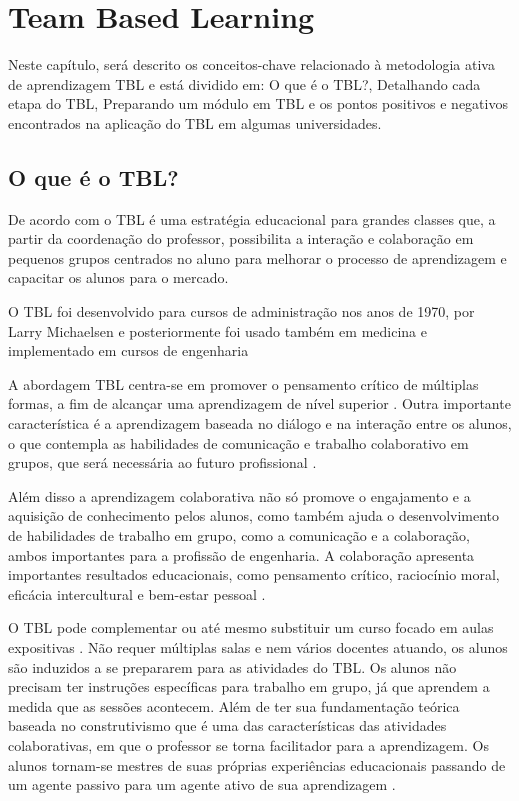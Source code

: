 \chapter{Team Based Learning}

Neste capítulo, será descrito os conceitos-chave relacionado à metodologia ativa de aprendizagem TBL e está dividido em: O que é o TBL?, Detalhando cada etapa do TBL, Preparando um módulo em TBL e os pontos positivos e negativos encontrados na aplicação do TBL em algumas universidades.

\section{O que é o TBL?}

De acordo com \cite{burgess} o TBL é uma estratégia educacional para grandes classes que, a partir da coordenação do professor, possibilita a interação e colaboração em pequenos grupos centrados no aluno para melhorar o processo de aprendizagem e capacitar os alunos para o mercado.

O TBL foi desenvolvido para cursos de administração nos anos de 1970, por Larry Michaelsen \cite{sweet} e posteriormente foi usado também em medicina e implementado em cursos de engenharia \cite{matalonga}

A abordagem TBL centra-se em promover o pensamento crítico de múltiplas formas, a fim de alcançar uma aprendizagem de nível superior \cite{gomez}. Outra importante característica é a aprendizagem baseada no diálogo e na interação entre os alunos, o que contempla as habilidades de comunicação e trabalho colaborativo em grupos, que será necessária ao futuro profissional \cite{bollela}.

Além disso a aprendizagem colaborativa não só  promove o engajamento e a aquisição de conhecimento pelos alunos, como também ajuda o desenvolvimento de habilidades de trabalho em grupo, como a comunicação e a colaboração, ambos importantes para a profissão de engenharia. A colaboração apresenta importantes resultados educacionais, como pensamento crítico, raciocínio moral, eficácia intercultural e bem-estar pessoal \cite{cabrera}.

O TBL pode complementar ou até mesmo substituir um curso focado em aulas expositivas \cite{dean}. Não requer múltiplas salas e nem vários docentes atuando, os alunos são induzidos a se prepararem para as atividades do TBL. Os alunos não precisam ter instruções específicas para trabalho em grupo, já que aprendem a medida que as sessões acontecem. Além de ter sua fundamentação teórica baseada no construtivismo que é uma das características das atividades colaborativas, em que o professor se torna facilitador para a aprendizagem. Os alunos tornam-se mestres de suas próprias experiências educacionais passando de um agente passivo para um agente ativo de sua aprendizagem \cite{bollela}.

